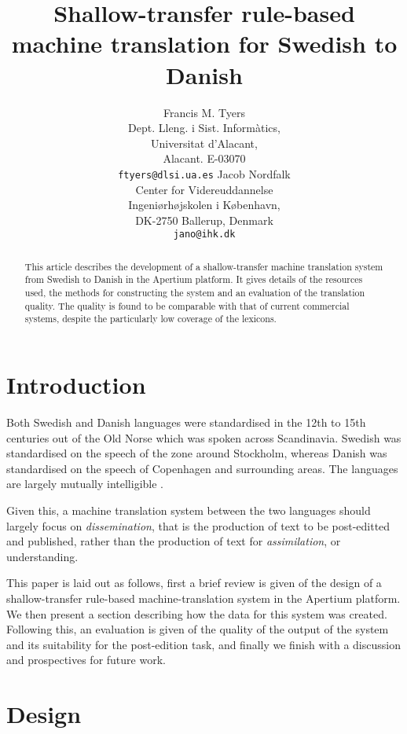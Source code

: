 \documentclass[11pt]{article}
\title{Shallow-transfer rule-based machine translation for Swedish to Danish}
\author{Francis M. Tyers\\
  Dept. Lleng. i Sist. Informàtics, \\
  Universitat d'Alacant,\\
  Alacant. E-03070\\  
  {\tt ftyers@dlsi.ua.es} \And
  Jacob Nordfalk\\
  Center for Videreuddannelse\\
  Ingeniørhøjskolen i København,\\
  DK-2750 Ballerup, Denmark\\
  {\tt jano@ihk.dk}
}
\date{}
\begin{document}
\maketitle

\begin{abstract}
  This article describes the development of a shallow-transfer machine translation
  system from Swedish to Danish in the Apertium platform. It gives details of the 
  resources used, the methods for constructing the system and an evaluation of the 
  translation quality. The quality is found to be comparable with that of current
  commercial systems, despite the particularly low coverage of the lexicons.
\end{abstract}

\section{Introduction}

Both Swedish and Danish languages were standardised in the 12th to 15th centuries out
of the Old Norse which was spoken across Scandinavia. Swedish was standardised on the 
speech of the zone around Stockholm, whereas Danish was standardised on the speech of  %
Copenhagen and surrounding areas. The languages are largely mutually intelligible \citep{Haugen1990}.

Given this, a machine translation system between the two languages should largely
focus on \emph{dissemination}, that is the production of text to be post-editted and 
published, rather than the production of text for \emph{assimilation}, or understanding.

This paper is laid out as follows, first a brief review is given of the design of a 
shallow-transfer rule-based machine-translation system in the Apertium platform. We then 
present a section describing how the data for this system was created. Following this, %
an evaluation is given of the quality of the output of the system and its suitability 
for the post-edition task, and finally we finish with a discussion and prospectives 
for future work.


\section{Design}
\end{document}
